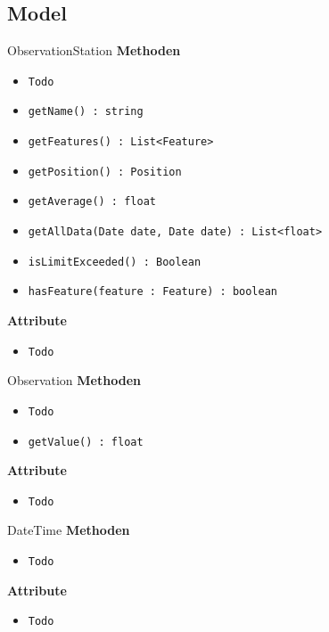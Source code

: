 \subsection{Model}

    \begin{Class}{ObservationStation}
        \textbf{Methoden}
        \begin{itemize}
            \item \texttt{Todo}
            \item \texttt{getName() : string}
            \item \texttt{getFeatures() : List<Feature>}
            \item \texttt{getPosition() : Position}
            \item \texttt{getAverage() : float}
            \item \texttt{getAllData(Date date, Date date) : List<float>}
            \item \texttt{isLimitExceeded() : Boolean}
            \item \texttt{hasFeature(feature : Feature) : boolean}
        \end{itemize}
        
        \textbf{Attribute}
        \begin{itemize}
            \item \texttt{Todo}
        \end{itemize}
    \end{Class}

    \begin{Class}{Observation}
        \textbf{Methoden}
        \begin{itemize}
            \item \texttt{Todo}
            \item \texttt{getValue() : float}
        \end{itemize}
        
        \textbf{Attribute}
        \begin{itemize}
            \item \texttt{Todo}
        \end{itemize}
    \end{Class}

    \begin{Class}{DateTime}
        \textbf{Methoden}
        \begin{itemize}
            \item \texttt{Todo}
        \end{itemize}
        
        \textbf{Attribute}
        \begin{itemize}
            \item \texttt{Todo}
        \end{itemize}
    \end{Class}

